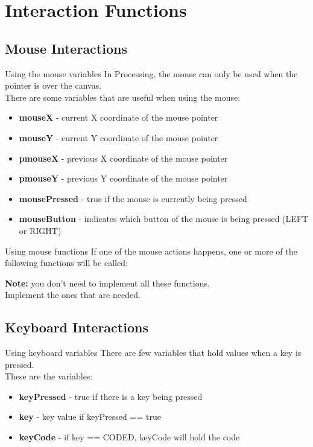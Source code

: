 \documentclass{beamer}
\begin{document}
\section{Interaction Functions}

\subsection{Mouse Interactions}

\begin{frame}{Using the mouse variables}
In Processing, the mouse can only be used when the pointer
is over the canvas.\\
There are some variables that are useful when using the mouse:

\begin{itemize}
\item{\textbf{mouseX} - current X coordinate of the mouse pointer}
\item{\textbf{mouseY} - current Y coordinate of the mouse pointer}
\item{\textbf{pmouseX} - previous X coordinate of the mouse pointer}
\item{\textbf{pmouseY} - previous Y coordinate of the mouse pointer}
\item{\textbf{mousePressed} - true if the mouse is currently being pressed}
\item{\textbf{mouseButton} - indicates which button of the mouse is being pressed (LEFT or RIGHT)}
\end{itemize}
\end{frame}

\begin{frame}{Using mouse functions}
If one of the mouse actions happens, one or more of the following functions will be called:\\

\lstMouse

\textbf{Note: } you don't need to implement all these functions.\\
Implement the ones that are needed.
\end{frame}

\subsection{Keyboard Interactions}

\begin{frame}{Using keyboard variables}
There are few variables that hold values when a key is pressed.\\
These are the variables:\\

\begin{itemize}
\item{\textbf{keyPressed} - true if there is a key being pressed}
\item{\textbf{key} - key value if keyPressed == true}
\item{\textbf{keyCode} - if key == CODED, keyCode will hold the code}
\end{itemize}
\end{frame}
\end{document}
